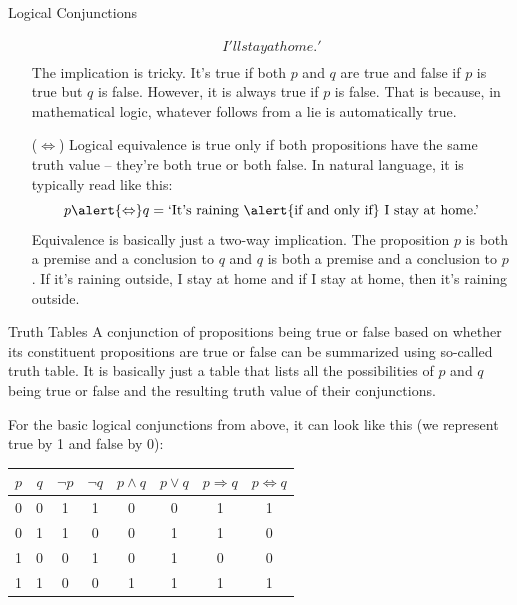 \documentclass[final]{beamer}
\newlength{\colwidth}
\begin{document}
\begin{frame}[t]
\begin{columns}[t]
\begin{column}{\colwidth}
\begin{exampleblock}{Logical Conjunctions}
\begin{itemize}[left=40pt]
\begin{align*}
{     I'll stay at home.'}\\
    \end{align*}
    The implication is tricky. It's true if both $p$ and $q$ are true and false
    if $p$ is true but $q$ is false. However, it is \alert{always true} if $p$
    is \alert{false}. That is because, in mathematical logic, whatever follows
    from a lie is automatically true.
   \item[($ \Leftrightarrow $)] Logical \alert{equivalence} is true only if both
    propositions have the \alert{same truth value} -- they're both true or both
    false. In natural language, it is typically read like this:
    \[
     p \alert{ \Leftrightarrow }q = \text{`It's raining \alert{if and only if}
     I stay at home.'}
    \]
    Equivalence is basically just a two-way implication. The proposition $p$ is
    both a premise and a conclusion to $q$ and $q$ is both a premise and a
    conclusion to $p$. If it's raining outside, I stay at home and if I stay at
    home, then it's raining outside.
  \end{itemize}
 \end{exampleblock}

 \begin{block}{Truth Tables}
  A conjunction of propositions being true or false based on whether its
  constituent propositions are true or false can be summarized using so-called
  \alert{truth table}. It is basically just a table that lists all the
  possibilities of $p$ and $q$ being true or false and the resulting truth value
  of their conjunctions.

  For the basic logical conjunctions from above, it can look like this (we
  represent \alert{true} by \alert{1} and \alert{false} by \alert{0}):
  \begin{center}
   \begin{tabular}{c | c | c | c | c | c | c | c}
    $p$ & $q$ & $\neg p$ & $\neg q$ & $p \wedge q$ & $p \vee q$ & $p \Rightarrow
    q$ & $p \Leftrightarrow q$\\
    \toprule
    0 & 0 & 1 & 1 & 0 & 0 & 1 & 1\\
    \midrule
    0 & 1 & 1 & 0 & 0 & 1 & 1 & 0\\
    \midrule
    1 & 0 & 0 & 1 & 0 & 1 & 0 & 0\\
    \midrule
    1 & 1 & 0 & 0 & 1 & 1 & 1 & 1
   \end{tabular}
  \end{center}
 \end{block}
\end{column}


\end{columns}
\end{frame}
\end{document}
